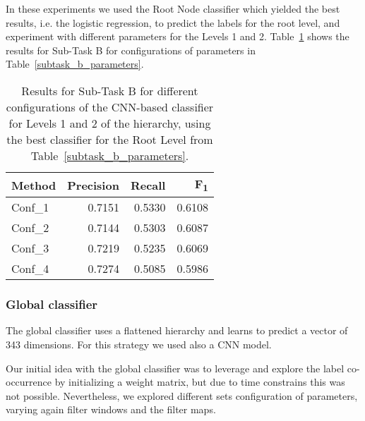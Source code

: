 \documentclass[11pt,a4paper]{article}
\begin{document}
In these experiments we used the Root Node classifier which yielded the best
results, i.e. the logistic regression, to predict the labels for the root level,
and experiment with different parameters for the Levels 1 and 2. Table~\ref{level-1-2} shows
the results for Sub-Task B for configurations of parameters in Table~\ref{subtask_b_parameters}.

\begin{table}[!h]
\begin{center}
\begin{tabular}{|l|r|r|r|}
\hline\centering\textbf{Method}  & \textbf{Precision} &  \textbf{Recall} &  \textbf{F\textsubscript{1}}\\
\hline
 Conf\_1 & 0.7151 & 0.5330 & 0.6108 \\
 Conf\_2 & 0.7144 & 0.5303 & 0.6087 \\
 Conf\_3 & 0.7219 & 0.5235 & 0.6069 \\
 Conf\_4 & 0.7274 & 0.5085 & 0.5986 \\
\hline
\end{tabular}
\end{center}
\caption{\label{level-1-2} Results for Sub-Task B for different configurations
of the CNN-based classifier for Levels 1 and 2 of the hierarchy, using the best
classifier for the Root Level from Table~\ref{subtask_b_parameters}.}
\end{table}






\subsubsection{Global classifier}


The global classifier uses a flattened hierarchy and learns to predict a vector
of 343 dimensions. For this strategy we used also a CNN model.

Our initial idea with the global classifier was to leverage and explore the label
co-occurrence by initializing a weight matrix, but due to time constrains this was
not possible. Nevertheless, we explored different sets configuration of parameters,
varying again filter windows and the filter maps.
\end{document}
